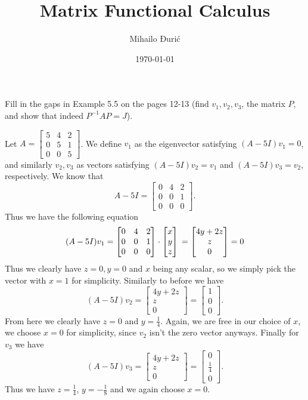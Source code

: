 \documentclass{article}
\title{Matrix Functional Calculus}
\author{Mihailo Đurić}
\date{\today}
\begin{document}
\maketitle
\newpage

\begin{problem}
  Fill in the gaps in Example 5.5 on the pages 12-13 (find $v_1, v_2, v_3$, the matrix $P$, and show that indeed $P^{-1} A P = J$).
\end{problem}

\begin{solution}
  Let $A = \begin{bmatrix} 5 & 4 & 2\\ 0 & 5 & 1\\ 0 & 0 & 5 \end{bmatrix}$.
  We define $v_1$ as the eigenvector satisfying $(A - 5 I) v_1 = 0$, and similarly $v_2, v_3$ as vectors satisfying $(A - 5 I) v_2 = v_1$ and $(A - 5 I) v_3 = v_2$, respectively.
  We know that
  \[A - 5 I = \begin{bmatrix} 0 & 4 & 2\\ 0 & 0 & 1\\ 0 & 0 & 0 \end{bmatrix}.\]
  Thus we have the following equation
  \[(A - 5 I) v_1 = \begin{bmatrix} 0 & 4 & 2\\ 0 & 0 & 1\\ 0 & 0 & 0 \end{bmatrix} \cdot \begin{bmatrix} x\\ y\\ z \end{bmatrix}\\ = \begin{bmatrix} 4y + 2z\\ z\\ 0 \end{bmatrix} = 0\]
  Thus we clearly have $z = 0, y = 0$ and $x$ being any scalar, so we simply pick the vector with $x = 1$ for simplicity.
  Similarly to before we have
  \[(A - 5 I) v_2 = \begin{bmatrix} 4y + 2z\\ z\\ 0 \end{bmatrix} = \begin{bmatrix} 1\\ 0\\ 0 \end{bmatrix}.\]
  From here we clearly have $z = 0$ and $y = \frac{1}{4}$.
  Again, we are free in our choice of $x$, we choose $x = 0$ for simplicity, since $v_2$ isn't the zero vector anyways.
  Finally for $v_3$ we have
  \[(A - 5 I) v_3 = \begin{bmatrix} 4y + 2z\\ z\\ 0 \end{bmatrix} = \begin{bmatrix} 0\\ \frac{1}{4}\\ 0 \end{bmatrix}.\]
  Thus we have $z = \frac{1}{4}$, $y = - \frac{1}{8}$ and we again choose $x = 0$.


\end{solution}
\end{document}

